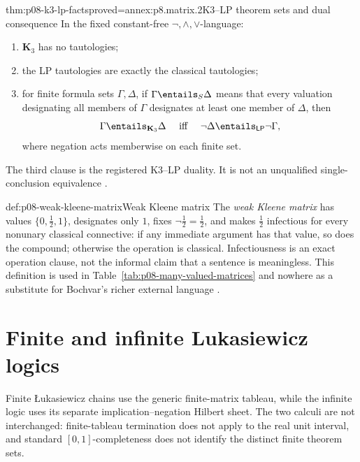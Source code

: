 \begin{hbtheorem}{thm:p08-k3-lp-facts}{proved=annex:p8.matrix.2}{K3--LP theorem sets and dual consequence}
In the fixed constant-free \(\neg,\land,\lor\)-language:
\begin{enumerate}
  \item \(\mathbf K_3\) has no tautologies;
  \item the LP tautologies are exactly the classical tautologies;
  \item for finite formula sets \(\Gamma,\Delta\), if
        \(\Gamma\entails_S\Delta\) means that every valuation designating all
        members of \(\Gamma\) designates at least one member of \(\Delta\),
        then
        \[
          \Gamma\entails_{\mathbf K_3}\Delta
          \quad\text{ iff }\quad
          \neg\Delta\entails_{\mathsf{LP}}\neg\Gamma,
        \]
        where negation acts memberwise on each finite set.
\end{enumerate}
The third clause is the registered K3--LP duality.  It is not an unqualified
single-conclusion equivalence \cite{Priest1979,OmoriWansing2017}.
\end{hbtheorem}

\begin{hbdefinition}{def:p08-weak-kleene-matrix}{Weak Kleene matrix}
The \emph{weak Kleene matrix} has values
\(\{0,\tfrac12,1\}\), designates only \(1\), fixes
\(\neg\tfrac12=\tfrac12\), and makes \(\tfrac12\) infectious for every
nonunary classical connective: if any immediate argument has that value, so
does the compound; otherwise the operation is classical.  Infectiousness is
an exact operation clause, not the informal claim that a sentence is
meaningless.  This definition is used in Table~\ref{tab:p08-many-valued-matrices}
and nowhere as a substitute for Bochvar's richer external language
\cite{Kleene1952}.
\end{hbdefinition}

\section{Finite and infinite Lukasiewicz logics}

Finite \L{}ukasiewicz chains use the generic finite-matrix tableau, while the
infinite logic uses its separate implication--negation Hilbert sheet.  The two
calculi are not interchanged: finite-tableau termination does not apply to the
real unit interval, and standard \([0,1]\)-completeness does not identify the
distinct finite theorem sets.

